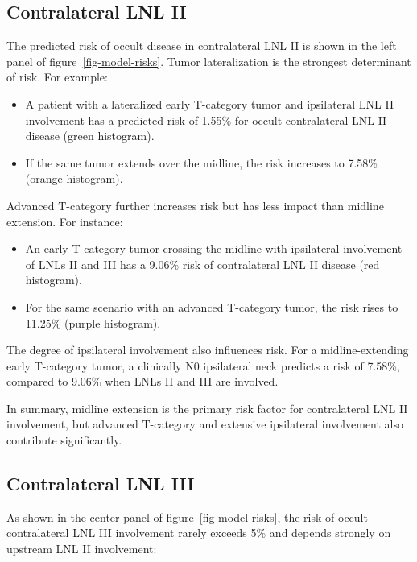 \documentclass[
  sn-mathphys-num,
]{sn-jnl}
\providecommand{\tightlist}{%
  \setlength{\itemsep}{0pt}\setlength{\parskip}{0pt}}\usepackage{longtable,booktabs,array}
\begin{document}
\subsection{Contralateral LNL II}\label{contralateral-lnl-ii}

The predicted risk of occult disease in contralateral LNL II is shown in
the left panel of figure~\ref{fig-model-risks}. Tumor lateralization is
the strongest determinant of risk. For example:

\begin{itemize}
\tightlist
\item
  A patient with a lateralized early T-category tumor and ipsilateral
  LNL II involvement has a predicted risk of 1.55\% for occult
  contralateral LNL II disease (green histogram).\\
\item
  If the same tumor extends over the midline, the risk increases to
  7.58\% (orange histogram).
\end{itemize}

Advanced T-category further increases risk but has less impact than
midline extension. For instance:

\begin{itemize}
\tightlist
\item
  An early T-category tumor crossing the midline with ipsilateral
  involvement of LNLs II and III has a 9.06\% risk of contralateral LNL
  II disease (red histogram).\\
\item
  For the same scenario with an advanced T-category tumor, the risk
  rises to 11.25\% (purple histogram).
\end{itemize}

The degree of ipsilateral involvement also influences risk. For a
midline-extending early T-category tumor, a clinically N0 ipsilateral
neck predicts a risk of 7.58\%, compared to 9.06\% when LNLs II and III
are involved.

In summary, midline extension is the primary risk factor for
contralateral LNL II involvement, but advanced T-category and extensive
ipsilateral involvement also contribute significantly.

\subsection{Contralateral LNL III}\label{contralateral-lnl-iii}

As shown in the center panel of figure~\ref{fig-model-risks}, the risk
of occult contralateral LNL III involvement rarely exceeds 5\% and
depends strongly on upstream LNL II involvement:
\end{document}
